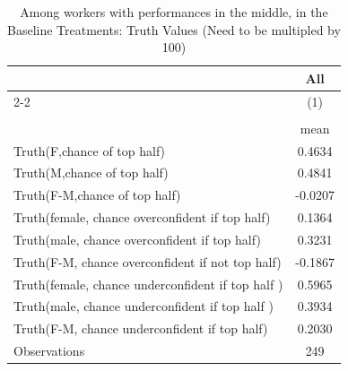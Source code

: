 \begin{table}[htbp]\centering
\def\sym#1{\ifmmode^{#1}\else\(^{#1}\)\fi}
\caption{Among workers with performances in the middle, in the Baseline Treatments: Truth Values (Need to be multipled by 100)}
\begin{tabular}{l*{1}{c}}
\hline\hline
                    &\multicolumn{1}{c}{All}\\\cmidrule(lr){2-2}
                    &\multicolumn{1}{c}{(1)}\\
                    &\multicolumn{1}{c}{}\\
                    &        mean\\
\hline
Truth(F,chance of top half)&      0.4634\\
Truth(M,chance of top half)&      0.4841\\
Truth(F-M,chance of top half)&     -0.0207\\
Truth(female, chance overconfident if top half)&      0.1364\\
Truth(male, chance overconfident if top half)&      0.3231\\
Truth(F-M, chance overconfident if not top half)&     -0.1867\\
Truth(female, chance underconfident if top half )&      0.5965\\
Truth(male, chance underconfident if top half )&      0.3934\\
Truth(F-M, chance underconfident if top half)&      0.2030\\
\hline
Observations        &         249\\
\hline\hline
\end{tabular}
\end{table}
